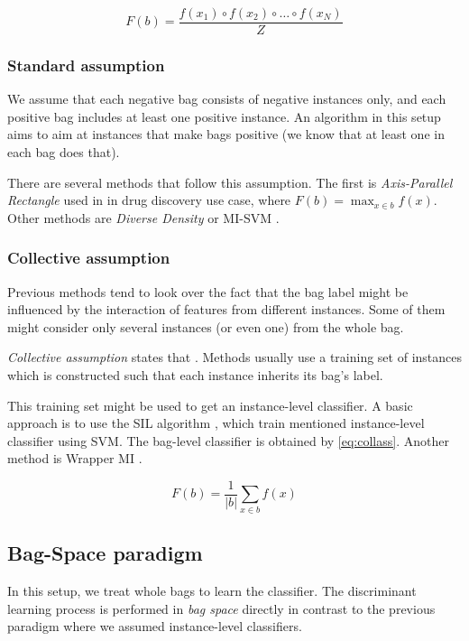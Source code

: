\begin{equation} \label{eq:bagsclas}
    F(b)=\frac{f(x_1)\circ f(x_2)\circ\dots\circ f(x_N)}{Z}
\end{equation}

\subsubsection{Standard assumption}
We assume that each negative bag consists of negative instances only, and each positive bag includes at least one positive instance. An algorithm in this setup aims to aim at instances that make bags positive (we know that at least one in each bag does that).

There are several methods that follow this assumption. The first is \emph{Axis-Parallel Rectangle} used in \cite{Dietterich1997} in drug discovery use case, where $F(b)=\max_{x\in b}f(x)$. Other methods are \emph{Diverse Density} \cite{Maron1998} or MI-SVM \cite{Andrews2003}.

\subsubsection{Collective assumption}
Previous methods tend to look over the fact that the bag label might be influenced by the interaction of features from different instances. Some of them might consider only several instances (or even one) from the whole bag.

\emph{Collective assumption} states that  \cite{Xu2003}. Methods usually use a training set of instances which is constructed such that each instance inherits its bag's label.

This training set might be used to get an instance-level classifier. A basic approach is to use the SIL algorithm \cite{Bunescu2007}, which train mentioned instance-level classifier using SVM. The bag-level classifier is obtained by \ref{eq:collass}. Another method is Wrapper MI \cite{Frank2003}.

\begin{equation} \label{eq:collass}
    F(b)=\frac{1}{|b|}\sum_{x\in b}f(x)
\end{equation}

\subsection{Bag-Space paradigm}
In this setup, we treat whole bags to learn the classifier. The discriminant learning process is performed in \emph{bag space} directly in contrast to the previous paradigm where we assumed instance-level classifiers.

